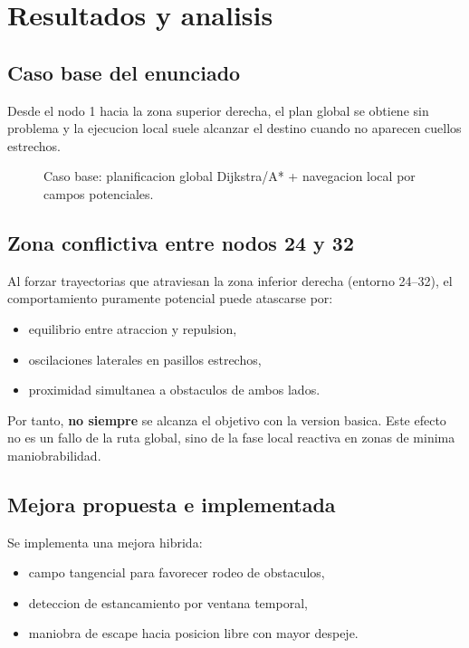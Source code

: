 \documentclass[12pt]{article}
\begin{document}
\section{Resultados y analisis}

\subsection{Caso base del enunciado}
Desde el nodo 1 hacia la zona superior derecha, el plan global se obtiene sin problema y la ejecucion local suele alcanzar el destino cuando no aparecen cuellos estrechos.

\begin{figure}[H]
  \centering
  \caption{Caso base: planificacion global Dijkstra/A* + navegacion local por campos potenciales.}
  \label{fig:nav_caso_base}
\end{figure}

\subsection{Zona conflictiva entre nodos 24 y 32}
Al forzar trayectorias que atraviesan la zona inferior derecha (entorno 24--32), el comportamiento puramente potencial puede atascarse por:
\begin{itemize}[leftmargin=2em]
  \item equilibrio entre atraccion y repulsion,
  \item oscilaciones laterales en pasillos estrechos,
  \item proximidad simultanea a obstaculos de ambos lados.
\end{itemize}

Por tanto, \textbf{no siempre} se alcanza el objetivo con la version basica. Este efecto no es un fallo de la ruta global, sino de la fase local reactiva en zonas de minima maniobrabilidad.

\subsection{Mejora propuesta e implementada}
Se implementa una mejora hibrida:
\begin{itemize}[leftmargin=2em]
  \item campo tangencial para favorecer rodeo de obstaculos,
  \item deteccion de estancamiento por ventana temporal,
  \item maniobra de escape hacia posicion libre con mayor despeje.
\end{itemize}
\end{document}
